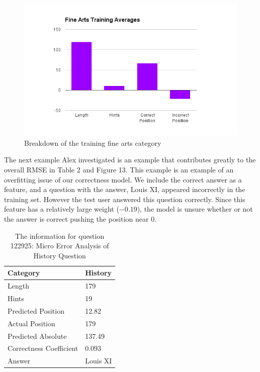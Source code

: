 \documentclass[letterpaper]{article}
\begin{document}
\begin{figure}[H]
\centering
\includegraphics[scale=0.5]{finearts.png}
\caption{Breakdown of the training fine arts category}
\label{fig:mircoFA}
\end{figure}


The next example Alex investigated is an example that contributes greatly to the overall RMSE in Table 2 and Figure 13.  This example is an example of an overfitting issue of our correctness model.  We include the correct answer as a feature, and a question with the answer, Louis XI, appeared incorrectly in the training set.  However the test user answered this question correctly.  Since this feature has a relatively large weight ($-0.19$), the model is unsure whether or not the answer is correct pushing the position near $0$. 

\begin{table}[H]
\centering
\begin{tabular}{|l|l |}
\hline
Category & History \\ \hline
Length &  179 \\
Hints & 19 \\
Predicted Position & 12.82 \\
Actual Position & 179\\ 
Predicted Absolute & 137.49 \\ 
Correctness Coefficient & 0.093 \\
Answer & Louis XI \\ \hline

\end{tabular}
\caption{The information for question 122925: Micro Error Analysis of History Question}
\label{table:ex_history}
\end{table}
\end{document}
